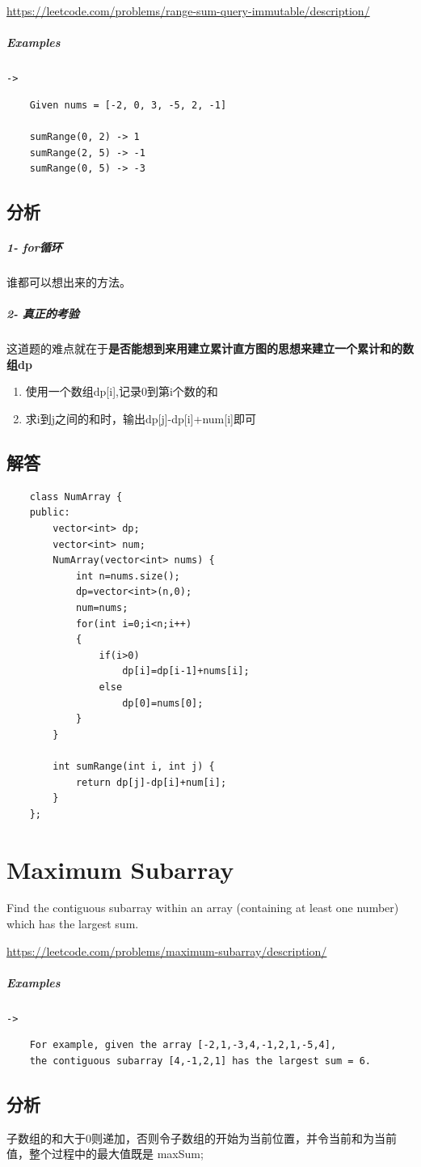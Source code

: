 \documentclass[UTF8,a4paper,12pt]{ctexbook}
\begin{document}
		\url{https://leetcode.com/problems/range-sum-query-immutable/description/}
	\subparagraph{Examples}\verb|->|
		\begin{lstlisting}
	Given nums = [-2, 0, 3, -5, 2, -1]
	
	sumRange(0, 2) -> 1
	sumRange(2, 5) -> -1
	sumRange(0, 5) -> -3		
		\end{lstlisting}
		
	\subsection{分析}
		\subparagraph{1- for循环} 谁都可以想出来的方法。
		\subparagraph{2- 真正的考验} 这道题的难点就在于\textbf{是否能想到来用建立累计直方图的思想来建立一个累计和的数组dp}
		
			\begin{enumerate}[itemindent = 2em]
				\item 使用一个数组dp[i],记录0到第i个数的和
				\item 求i到j之间的和时，输出dp[j]-dp[i]+num[i]即可
			\end{enumerate}
		
	\subsection{解答}
		\begin{lstlisting}
	class NumArray {  
	public:  
		vector<int> dp;  
		vector<int> num;  
		NumArray(vector<int> nums) {  
			int n=nums.size();  
			dp=vector<int>(n,0);  
			num=nums;  
			for(int i=0;i<n;i++)  
			{  
				if(i>0)  
					dp[i]=dp[i-1]+nums[i];  
				else  
					dp[0]=nums[0];  
			}  
		}  
		
		int sumRange(int i, int j) {  
			return dp[j]-dp[i]+num[i];  
		}  
	}; 
		\end{lstlisting}
\section{Maximum Subarray}
	Find the contiguous subarray within an array (containing at least one number) which has the largest sum.
	
	\url{https://leetcode.com/problems/maximum-subarray/description/}
	\subparagraph{Examples}\verb|->|
		\begin{lstlisting}
	For example, given the array [-2,1,-3,4,-1,2,1,-5,4],
	the contiguous subarray [4,-1,2,1] has the largest sum = 6.
		\end{lstlisting}
		
	\subsection{分析}
		子数组的和大于0则递加，否则令子数组的开始为当前位置，并令当前和为当前值，整个过程中的最大值既是 maxSum;
		
\end{document}
